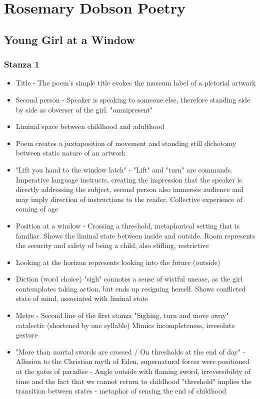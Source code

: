 
\chapter{Rosemary Dobson Poetry}

\section{Young Girl at a Window}
\subsection{Stanza 1}
	\begin{itemize}
		\item Title - The poem's simple title evokes the museum label of a pictorial artwork
		\item Second person - Speaker is speaking to someone else, therefore standing side by side as obverser of the girl. "omnipresent"
		\item Liminal space between childhood and adulthood
		\item Poem creates a juxtaposition of movement and standing still
			\subitem dichotomy between static nature of an artwork
		\item "Lift you hand to the window latch" - "Lift" and "turn" are commands. Imperative language instructs, creating the impression that the speaker is directly addressing the subject, second person also immerses audience and may imply direction of instructions to the reader. Collective experience of coming of age
		\item Position at a window - Crossing a threshold, metaphorical setting that is familiar. Shows the liminal state between inside and outside. Room represents the security and safety of being a child, also stifling, restrictive
		\item Looking at the horizon represents looking into the future (outside)
		\item Diction (word choice) "sigh" connotes a sense of wistful unease, as the girl contemplates taking action, but ends up resigning herself. Shows conflicted state of mind, associated with liminal state
		\item Metre - Second line of the first stanza "Sighing, turn and move away" catalectic (shortened by one syllable) Mimics incompleteness, irresolute gesture
		\item "More than mortal swords are crossed / On thresholds at the end of day" - Allusion to the Christian myth of Eden, supernatural forces were positioned at the gates of paradise - Angle outside with flaming sword, irreversibility of time and the fact that we cannot return to childhood "threshold" implies the transition between states - metaphor of sensing the end of childhood

\end{itemize}
